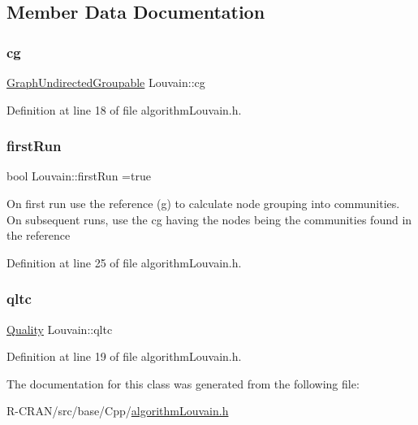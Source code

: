 \subsection{Member Data Documentation}
\mbox{\label{classLouvain_ad3b0b06892d045c7fa248c0c968f0276}} 
\subsubsection{\texorpdfstring{cg}{cg}}
{\footnotesize\ttfamily \hyperlink{classGraphUndirectedGroupable}{Graph\+Undirected\+Groupable} Louvain\+::cg\hspace{0.3cm}{\ttfamily [private]}}



Definition at line 18 of file algorithm\+Louvain.\+h.

\mbox{\label{classLouvain_a9b5827ca542b67330c44a971b02d7700}} 
\subsubsection{\texorpdfstring{first\+Run}{firstRun}}
{\footnotesize\ttfamily bool Louvain\+::first\+Run =true\hspace{0.3cm}{\ttfamily [private]}}

On first run use the reference (g) to calculate node grouping into communities. On subsequent runs, use the cg having the nodes being the communities found in the reference 

Definition at line 25 of file algorithm\+Louvain.\+h.

\mbox{\label{classLouvain_a8908ca314976918362417a3a8bf45014}} 
\subsubsection{\texorpdfstring{qltc}{qltc}}
{\footnotesize\ttfamily \hyperlink{classQuality}{Quality} Louvain\+::qltc\hspace{0.3cm}{\ttfamily [private]}}



Definition at line 19 of file algorithm\+Louvain.\+h.



The documentation for this class was generated from the following file\+:\begin{DoxyCompactItemize}
\item 
R-\/\+C\+R\+A\+N/src/base/\+Cpp/\hyperlink{algorithmLouvain_8h}{algorithm\+Louvain.\+h}\end{DoxyCompactItemize}
